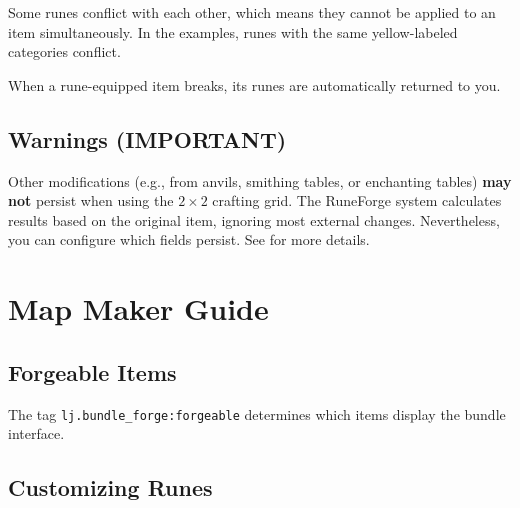 \documentclass[11pt]{article}
\begin{document}
Some runes conflict with each other, which means they cannot be applied to an item simultaneously. In the examples, runes with the same yellow-labeled categories conflict.

When a rune-equipped item breaks, its runes are automatically returned to you.

\subsection{Warnings (IMPORTANT)}

Other modifications (e.g., from anvils, smithing tables, or enchanting tables) \textbf{may not} persist when using the $2 \times 2$ crafting grid. The RuneForge system calculates results based on the original item, ignoring most external changes. Nevertheless, you can configure which fields persist. See  for more details.

\section{Map Maker Guide}

\newcommand{\compound}{\textcolor{blue!70}{\faCube}}
\newcommand{\stringicon}{\textcolor{green!60!black}{\faTag}}
\newcommand{\inticon}{\textcolor{red!70}{\faHashtag}}
\newcommand{\listicon}{\textcolor{purple!70}{\faListOl}}
\newcommand{\byteicon}{\textcolor{orange!70}{\faDotCircleO}}
\newcommand{\vertline}{\textSFviii\;}
\newcommand{\nodeend}{\textSFx\textSFx\;}
\newcommand{\nodesplit}{\textSFx\textSFii\;}
\newcommand{\desc}[1]{{\latin #1}}
\newcommand{\key}[1]{{\small\textbf{#1}}}

\subsection{Forgeable Items}

The tag \texttt{\small lj.bundle\_forge:forgeable} determines which items display the bundle interface.

\subsection{Customizing Runes}
\end{document}

